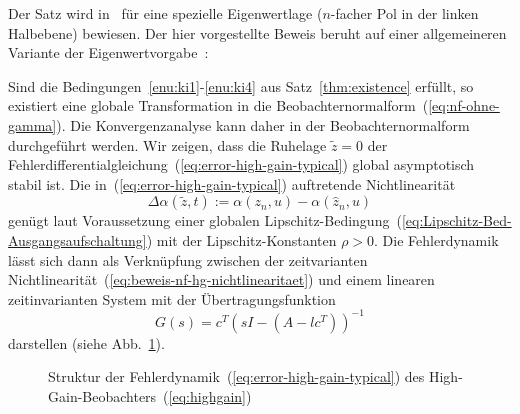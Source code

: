 Der Satz wird in~\cite{roebenack2004nolcos,roebenack2007iet} für
eine spezielle Eigenwertlage ($n$-facher Pol in der linken Halbebene)
bewiesen. Der hier vorgestellte Beweis beruht auf einer allgemeineren
Variante der Eigenwertvorgabe~\cite[Abschn.~{IV.A}]{roebenack2012ssd}: 
\begin{svmultproof2}
Sind die Bedingungen~\ref{enu:ki1}-\ref{enu:ki4} aus Satz~\ref{thm:existence}
erfüllt, so existiert eine globale Transformation in die Beobachternormalform~(\ref{eq:nf-ohne-gamma}).
Die Konvergenzanalyse kann daher in der Beobachternormalform durchgeführt
werden. Wir zeigen, dass die Ruhelage $\tilde{z}=0$ der Fehlerdifferentialgleichung~(\ref{eq:error-high-gain-typical})
global asymp\-to\-tisch stabil ist. Die in~(\ref{eq:error-high-gain-typical})
auftretende Nichtlinearität
\begin{equation}
\Delta\alpha(\tilde{z},t):=\alpha(z_{n},u)-\alpha(\hat{z}_{n},u)\label{eq:beweis-nf-hg-nichtlinearitaet}
\end{equation}
genügt laut Voraussetzung einer globalen Lipschitz-Bedingung~(\ref{eq:Lipschitz-Bed-Ausgangsaufschaltung})
mit der Lipschitz-Konstanten $\rho>0$. Die Fehlerdynamik lässt sich
dann als Verknüpfung zwischen der zeitvarianten Nichtlinearität~(\ref{eq:beweis-nf-hg-nichtlinearitaet})
und einem linearen zeit\-invarianten System mit der Übertragungsfunktion
\begin{equation}
G(s)=c^{T}\left(sI-\left(A-lc^{T}\right)\right)^{-1}\label{eq:bweis-nf-hg-G}
\end{equation}
darstellen (siehe Abb.~\ref{fig:Fehlerdynamik-NF-HG}). 
\begin{figure}
\begin{centering}
\resizebox{0.75\textwidth}{!}{}
\par\end{centering}
\caption{Struktur der Fehlerdynamik~(\ref{eq:error-high-gain-typical}) des
High-Gain-Beobachters~(\ref{eq:highgain})\label{fig:Fehlerdynamik-NF-HG}}
\end{figure}


\end{svmultproof2}
